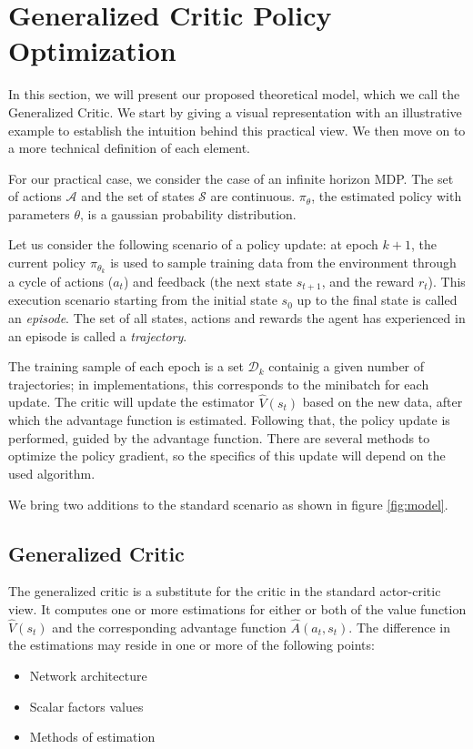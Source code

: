 \section{Generalized Critic Policy Optimization}
\label{sec:method}

In this section, we will present our proposed theoretical model, which we call the Generalized Critic. We start by giving a visual representation with an illustrative example to establish the intuition behind this practical view. We then move on to a more technical definition of each element.

For our practical case, we consider the case of an infinite horizon MDP. The set of actions $\mathcal{A}$ and the set of states $\mathcal{S}$ are continuous. $\pi_\theta$, the estimated policy with parameters $\theta$, is a gaussian probability distribution.

Let us consider the following scenario of a policy update: 
at epoch $k+1$, the current policy $\pi_{\theta_k}$ is used to sample training data from the environment through a cycle of actions ($a_t$) and feedback (the next state $s_{t+1}$, and the reward $r_t$). This execution scenario starting from the initial state $s_0$ up to the final state is called an \emph{episode}. The set of all states, actions and rewards the agent has experienced in an episode is called a \emph{trajectory}. 

The training sample of each epoch is a set $\mathcal{D}_k$ containig a given number of trajectories; in implementations, this corresponds to the minibatch for each update. The critic will update the estimator $\hat{V}(s_t)$ based on the new data, after which the advantage function is estimated. Following that, the policy update is performed, guided by the advantage function. There are several methods to optimize the policy gradient, so the specifics of this update will depend on the used algorithm.

We bring two additions to the standard scenario as shown in figure \ref{fig:model}.

\subsection{Generalized Critic}


The generalized critic is a substitute for the critic in the standard actor-critic view. It computes one or more estimations for either or both of the value function $\hat{V}(s_t)$ and the corresponding advantage function $\hat{A}(a_t, s_t)$. The difference in the estimations may reside in one or more of the following points:
\begin{itemize}
\item Network architecture
\item Scalar factors values
\item Methods of estimation
\end{itemize}

